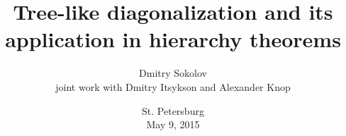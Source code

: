 

\title[Tree-like diagonalization]{
	Tree-like diagonalization and its application in hierarchy theorems
}
  
\author[Sokolov D.]{Dmitry Sokolov\\ joint work with Dmitry Itsykson and Alexander Knop}

\date{St. Petersburg\\
	May 9, 2015
}



	\maketitle

	
    
    



